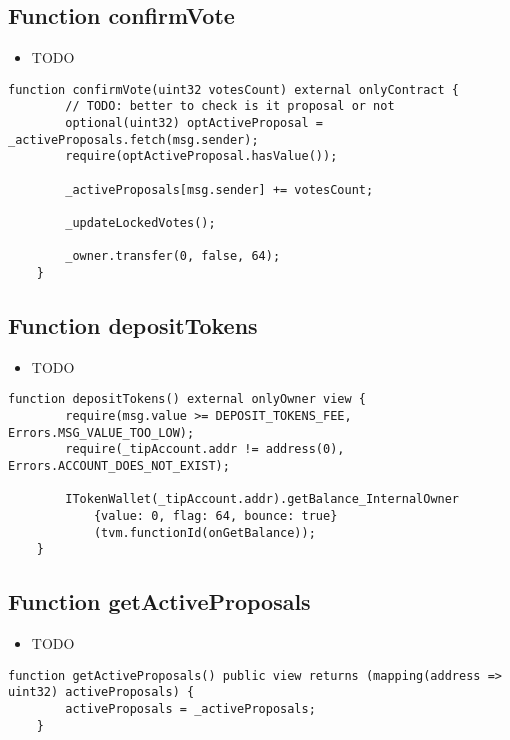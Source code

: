 \subsection{Function confirmVote}

\begin{itemize}
\item TODO
\end{itemize}

\begin{lstlisting}[firstnumber=74]
    function confirmVote(uint32 votesCount) external onlyContract {
        // TODO: better to check is it proposal or not
        optional(uint32) optActiveProposal = _activeProposals.fetch(msg.sender);
        require(optActiveProposal.hasValue());

        _activeProposals[msg.sender] += votesCount;
        
        _updateLockedVotes();

        _owner.transfer(0, false, 64);
    }
\end{lstlisting}

\subsection{Function depositTokens}

\begin{itemize}
\item TODO
\end{itemize}

\begin{lstlisting}[firstnumber=172]
    function depositTokens() external onlyOwner view {
        require(msg.value >= DEPOSIT_TOKENS_FEE, Errors.MSG_VALUE_TOO_LOW);
        require(_tipAccount.addr != address(0), Errors.ACCOUNT_DOES_NOT_EXIST);

        ITokenWallet(_tipAccount.addr).getBalance_InternalOwner
            {value: 0, flag: 64, bounce: true}
            (tvm.functionId(onGetBalance));
    }
\end{lstlisting}

\subsection{Function getActiveProposals}

\begin{itemize}
\item TODO
\end{itemize}

\begin{lstlisting}[firstnumber=228]
    function getActiveProposals() public view returns (mapping(address => uint32) activeProposals) {
        activeProposals = _activeProposals;
    }
\end{lstlisting}

